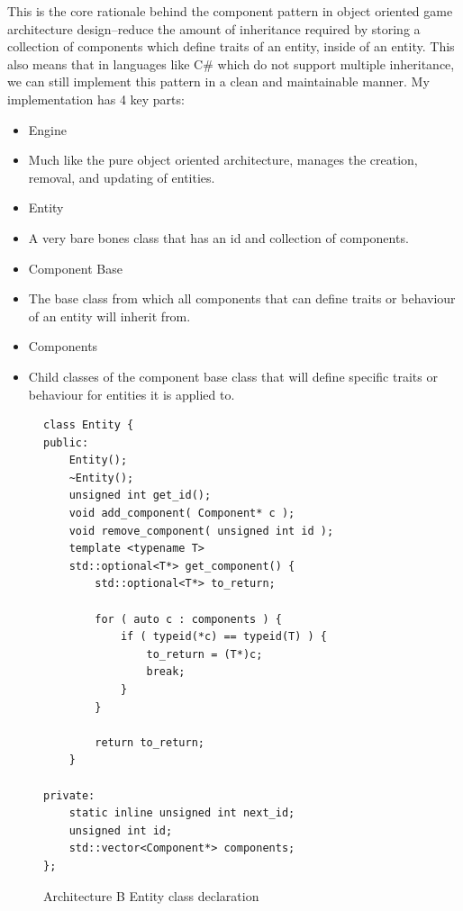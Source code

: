 \documentclass{article}
\begin{document}
This is the core rationale behind the component pattern in object oriented
game architecture design--reduce the amount of inheritance required by storing
a collection of components which define traits of an entity, inside of an
entity. This also means that in languages like C\# which do not support
multiple inheritance, we can still implement this pattern in a clean and
maintainable manner. My implementation has 4 key parts:

\begin{itemize}
    \item Engine
    \item[] Much like the pure object oriented architecture, manages the
            creation, removal, and updating of entities.

    \item Entity
    \item[] A very bare bones class that has an id and collection of components.

    \item Component Base
    \item[] The base class from which all components that can define traits or
            behaviour of an entity will inherit from.

    \item Components
    \item[] Child classes of the component base class that will define specific
            traits or behaviour for entities it is applied to.
\end{itemize}

\begin{figure}
\centering
\begin{BVerbatim}
class Entity {
public:
    Entity();
    ~Entity();
    unsigned int get_id();
    void add_component( Component* c );
    void remove_component( unsigned int id );
    template <typename T>
    std::optional<T*> get_component() {
        std::optional<T*> to_return;

        for ( auto c : components ) {
            if ( typeid(*c) == typeid(T) ) {
                to_return = (T*)c;
                break;
            }
        }

        return to_return;
    }

private:
    static inline unsigned int next_id;
    unsigned int id;
    std::vector<Component*> components;
};
\end{BVerbatim}
\caption{Architecture B Entity class declaration}
\label{arch_b_entity_header}
\end{figure}
\end{document}
